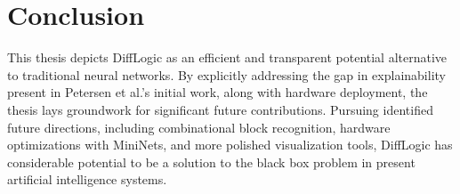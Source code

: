 \section{Conclusion}
\label{sec:conclusion}

This thesis depicts DiffLogic as an efficient and transparent potential alternative to traditional neural networks. By explicitly addressing the gap in explainability present in Petersen et al.'s initial work, along with hardware deployment, the thesis lays groundwork for significant future contributions. Pursuing identified future directions, including combinational block recognition, hardware optimizations with MiniNets, and more polished visualization tools, DiffLogic has considerable potential to be a solution to the black box problem in present artificial intelligence systems.









